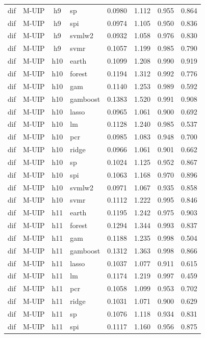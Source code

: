 \begin{ThreePartTable}
\begin{longtable}[t]{llclcccc}
dif & M-UIP & h9 & sp & 0.0980 & 1.112 & 0.955 & 0.864\\
dif & M-UIP & h9 & spi & 0.0974 & 1.105 & 0.950 & 0.836\\
dif & M-UIP & h9 & svmlw2 & 0.0932 & 1.058 & 0.976 & 0.830\\
dif & M-UIP & h9 & svmr & 0.1057 & 1.199 & 0.985 & 0.790\\
\addlinespace
dif & M-UIP & h10 & earth & 0.1099 & 1.208 & 0.990 & 0.919\\
dif & M-UIP & h10 & forest & 0.1194 & 1.312 & 0.992 & 0.776\\
dif & M-UIP & h10 & gam & 0.1140 & 1.253 & 0.989 & 0.592\\
dif & M-UIP & h10 & gamboost & 0.1383 & 1.520 & 0.991 & 0.908\\
dif & M-UIP & h10 & lasso & 0.0965 & 1.061 & 0.900 & 0.692\\
dif & M-UIP & h10 & lm & 0.1128 & 1.240 & 0.985 & 0.537\\
dif & M-UIP & h10 & pcr & 0.0985 & 1.083 & 0.948 & 0.700\\
dif & M-UIP & h10 & ridge & 0.0966 & 1.061 & 0.901 & 0.662\\
dif & M-UIP & h10 & sp & 0.1024 & 1.125 & 0.952 & 0.867\\
dif & M-UIP & h10 & spi & 0.1063 & 1.168 & 0.970 & 0.896\\
dif & M-UIP & h10 & svmlw2 & 0.0971 & 1.067 & 0.935 & 0.858\\
dif & M-UIP & h10 & svmr & 0.1112 & 1.222 & 0.995 & 0.846\\
\addlinespace
dif & M-UIP & h11 & earth & 0.1195 & 1.242 & 0.975 & 0.903\\
dif & M-UIP & h11 & forest & 0.1294 & 1.344 & 0.993 & 0.837\\
dif & M-UIP & h11 & gam & 0.1188 & 1.235 & 0.998 & 0.504\\
dif & M-UIP & h11 & gamboost & 0.1312 & 1.363 & 0.998 & 0.866\\
dif & M-UIP & h11 & lasso & 0.1037 & 1.077 & 0.911 & 0.615\\
dif & M-UIP & h11 & lm & 0.1174 & 1.219 & 0.997 & 0.459\\
dif & M-UIP & h11 & pcr & 0.1058 & 1.099 & 0.953 & 0.702\\
dif & M-UIP & h11 & ridge & 0.1031 & 1.071 & 0.900 & 0.629\\
dif & M-UIP & h11 & sp & 0.1076 & 1.118 & 0.934 & 0.831\\
dif & M-UIP & h11 & spi & 0.1117 & 1.160 & 0.956 & 0.875\\

\end{longtable}
\end{ThreePartTable}
